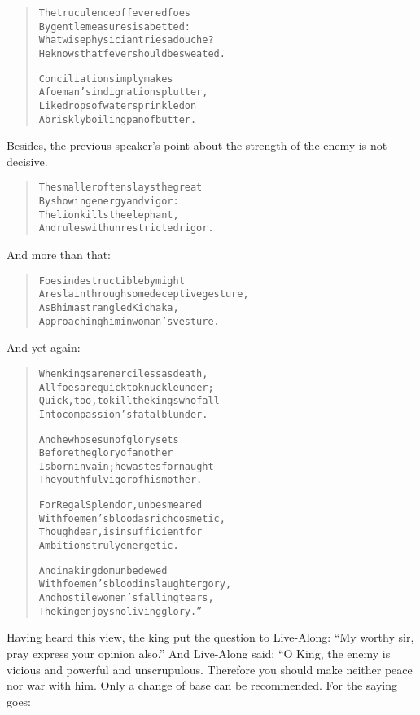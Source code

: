 \documentclass[article, twoside, 14pt]{memoir}
\renewenvironment{verbatim}{%
\begin{quote}%
\vskip -10pt%
\begin{alltt}\normalfont\large}{\end{alltt}%
\end{quote}%
\vskip -10pt
} %
\begin{document}
\begin{verbatim}
The truculence of fevered foes
    By gentle measures is abetted:
What wise physician tries a douche?
    He knows that fever should be sweated.

Conciliation simply makes
    A foeman's indignation splutter,
Like drops of water sprinkled on
    A briskly boiling pan of butter.
\end{verbatim}
Besides, the previous speaker's point about the strength of the
enemy is not decisive.

\begin{verbatim}
The smaller often slays the great
    By showing energy and vigor:
The lion kills the elephant,
    And rules with unrestricted rigor.
\end{verbatim}
And more than that:

\begin{verbatim}
Foes indestructible by might
    Are slain through some deceptive gesture,
As Bhima strangled Kichaka,
    Approaching him in woman's vesture.
\end{verbatim}
And yet again:

\begin{verbatim}
When kings are merciless as death,
    All foes are quick to knuckle under;
Quick, too, to kill the kings who fall
    Into compassion's fatal blunder.

And he whose sun of glory sets
    Before the glory of another
Is born in vain; he wastes for naught
    The youthful vigor of his mother.

For Regal Splendor, unbesmeared
    With foemen's blood as rich cosmetic,
Though dear, is insufficient for
    Ambitions truly energetic.

And in a kingdom unbedewed
    With foemen's blood in slaughter gory,
And hostile women's falling tears,
    The king enjoys no living glory.”
\end{verbatim}
Having heard this view, the king put the question to Live-Along:
``My worthy sir, pray express your opinion also.'' And Live-Along
said: “O King, the enemy is vicious and powerful and
unscrupulous. Therefore you should make neither peace nor war with
him. Only a change of base can be recommended. For the saying
goes:
\end{document}
